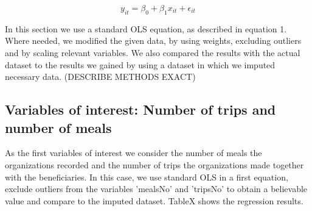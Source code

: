 \documentclass[12pt, a4paper, titlepage]{article}\usepackage[]{graphicx}\usepackage[]{color}
\begin{document}
\begin{equation}
\label{Equation 1}
  y_{it} = \beta_0 + \beta_1 x_{it} + \epsilon_{it}
\end{equation}

In this section we use a standard OLS equation, as described in equation 1. Where needed, we modified the given data, by using weights, excluding outliers and by scaling relevant variables. We also compared the results with the actual dataset to the results we gained by using a dataset in which we imputed necessary data. (DESCRIBE METHODS EXACT) 

\subsection{Variables of interest: Number of trips and number of meals} 

As the first variables of interest we consider the number of meals the organizations recorded and the number of trips the organizations made together with the beneficiaries. In this case, we use standard OLS in a first equation, exclude outliers from the variables 'mealsNo' and 'tripsNo' to obtain a believable value and compare to the imputed dataset. TableX shows the regression results.


\usepackage{booktabs}

\begin{table}
\caption{Regression Results: Number of meals}
\begin{center}
\label{GrantsRegressionsLunch}
\end{center}
\end{table}
\end{document}

